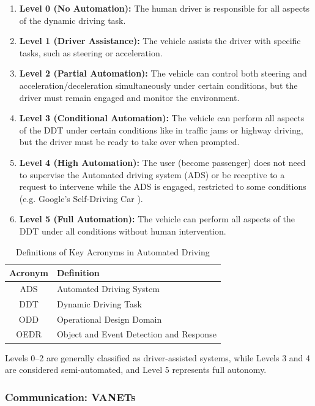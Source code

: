 \begin{enumerate}
    \item \textbf{Level 0 (No Automation):} The human driver is responsible for all aspects of the dynamic driving task.
    \item \textbf{Level 1 (Driver Assistance):} The vehicle assists the driver with specific tasks, such as steering or acceleration.
    \item \textbf{Level 2 (Partial Automation):} The vehicle can control both steering and acceleration/deceleration simultaneously under certain conditions, but the driver must remain engaged and monitor the environment.
    \item \textbf{Level 3 (Conditional Automation):} The vehicle can perform all aspects of the DDT under certain conditions like in traffic jams or highway driving, but the driver must be ready to take over when prompted.
    \item \textbf{Level 4 (High Automation):} The user (become passenger) does not need to supervise the Automated driving system (ADS) or be receptive to a request to intervene while the
    ADS is engaged, restricted to some conditions (e.g. Google's Self-Driving Car \cite{teoh2017rage}).
    \item \textbf{Level 5 (Full Automation):} The vehicle can perform all aspects of the DDT under all conditions without human intervention.
\end{enumerate}

\begin{table}[ht]
    \centering
    \begin{tabular}{|c|l|}
        \hline
        \textbf{Acronym} & \textbf{Definition} \\ \hline
        ADS & Automated Driving System \\ \hline
        DDT & Dynamic Driving Task \\ \hline
        ODD & Operational Design Domain \\ \hline
        OEDR & Object and Event Detection and Response \\ \hline
    \end{tabular}
    \caption{Definitions of Key Acronyms in Automated Driving}
    \label{tab:acronyms}
\end{table}

Levels 0–2 are generally classified as driver-assisted systems, while Levels 3 and 4 are considered semi-automated, and Level 5 represents full autonomy.

\subsubsection{Communication: VANETs}\label{subsubsec:communication}

